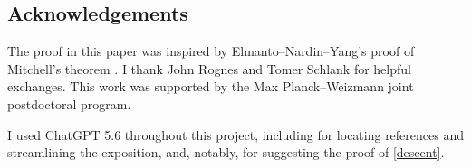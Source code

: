 \subsection*{Acknowledgements}

The proof in this paper was inspired by Elmanto--Nardin--Yang's proof of Mitchell's theorem \cite{ENY}.
I thank John Rognes and Tomer Schlank for helpful exchanges.
This work was supported by the Max Planck--Weizmann joint postdoctoral program.

I used ChatGPT 5.6 throughout this project, including for locating references and streamlining the exposition, and, notably, for suggesting the proof of \cref{descent}.
